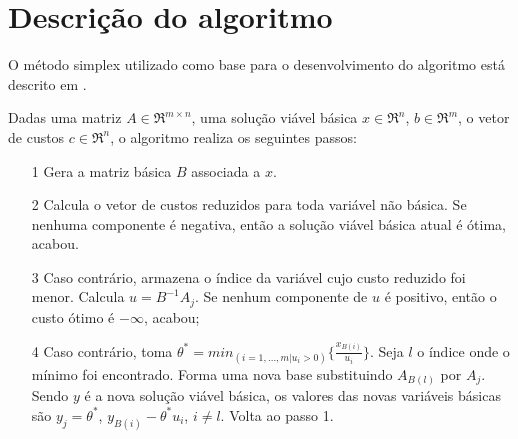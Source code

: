 \documentclass[
	12pt,				%
	openright,			%
	oneside,			%
	a4paper,			%
	english,			%
	french,				%
	spanish,			%
	brazil,				%
	]{abntex2}
\begin{document}
%
%
%
\chapter{Descrição do algoritmo}
O método simplex utilizado como base para o desenvolvimento do algoritmo está descrito em
  . 
  
  Dadas uma matriz $A \in \Re ^{m \times n}$, uma solução viável básica $x \in \Re ^n$, $b \in \Re ^m$, o vetor de custos $c \in\Re ^n$, o algoritmo realiza os seguintes passos:
  
\begin{itemize}
\item[1] Gera a matriz básica $B$ associada a $x$.
\item[2] Calcula o vetor de custos reduzidos para toda variável não
 básica. Se nenhuma componente é negativa, então a solução viável básica atual é
 ótima, acabou. 
\item[3]Caso contrário, armazena o índice da variável cujo custo reduzido foi menor.
Calcula $u = B^{-1}A_j$. Se nenhum componente de $u$ é positivo,
então o custo ótimo é $- \infty$, acabou;
\item[4]Caso contrário, toma $\theta ^* = min_{(i = 1,\ldots,m|u_i > 0)} \{\frac{x_{B(i)}}{u_i}\} $.
Seja $l$ o índice onde o mínimo foi encontrado. Forma uma nova
base substituindo $A_{B(l)}$ por $A_j$. Sendo $y$ é a nova solução viável básica, os valores
das novas variáveis básicas são $y_j = \theta ^*$, $y_{B(i)} - \theta ^* u_i$, $i\neq l$. Volta ao passo 1.
\end{itemize}
\end{document}
